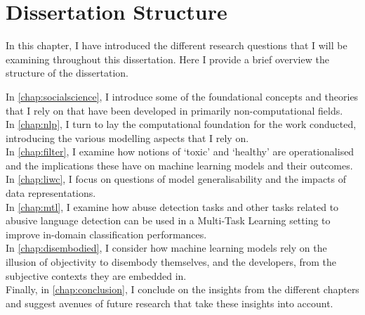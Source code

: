 \section{Dissertation Structure}\label{sec:structure}

In this chapter, I have introduced the different research questions that I will be examining throughout this dissertation. Here I provide a brief overview the structure of the dissertation.

In \cref{chap:socialscience}, I introduce some of the foundational concepts and theories that I rely on that have been developed in primarily non-computational fields.\\
In \cref{chap:nlp}, I turn to lay the computational foundation for the work conducted, introducing the various modelling aspects that I rely on.\\
In \cref{chap:filter}, I examine how notions of `toxic' and `healthy' are operationalised and the implications these have on machine learning models and their outcomes.\\
In \cref{chap:liwc}, I focus on questions of model generalisability and the impacts of data representations.\\
In \cref{chap:mtl}, I examine how abuse detection tasks and other tasks related to abusive language detection can be used in a Multi-Task Learning setting to improve in-domain classification performances.\\
In \cref{chap:disembodied}, I consider how machine learning models rely on the illusion of objectivity to disembody themselves, and the developers, from the subjective contexts they are embedded in.\\
Finally, in \cref{chap:conclusion}, I conclude on the insights from the different chapters and suggest avenues of future research that take these insights into account.


